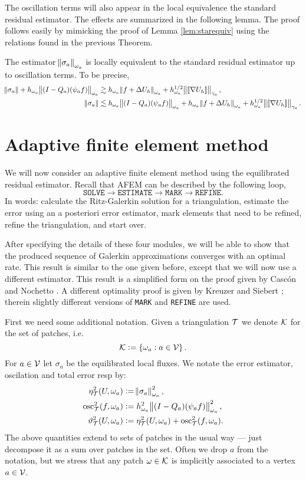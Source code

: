 \documentclass[thesis.tex]{subfiles}
\begin{document}
The oscillation terms will also appear in the local equivalence the standard residual estimator. 
The effects are summarized in the following lemma. The proof follows easily by mimicking the proof of Lemma \ref{lem:starequiv}
using the relations found in the previous Theorem.
\begin{lem}
  \label{lem:locequivosc}
  The estimator $\norm{\sigma_a}_{\omega_a}$ is locally equivalent to the standard residual estimator up to oscillation terms.
  To be precise, 
  \begin{align*}
    \norm{\sigma_a} + h_{\omega_a}\norm{(I - Q_a)(\psi_a f)}_{\omega_a} &\gtrsim h_{\omega_a} \norm{f + \Delta U_h}_{\omega_a} + h^{1/2}_{\omega_a} \norm{\llbracket \nabla U_h \rrbracket}_{\gamma_a},\\
    \norm{\sigma_a} &\lesssim h_{\omega_a}\norm{(I - Q_a)(\psi_a f)}_{\omega_a} + h_{\omega_a} \norm{f + \Delta U_h}_{\omega_a} + h^{1/2}_{\omega_a} \norm{\llbracket \nabla U_h \rrbracket}_{\gamma_a}.
  \end{align*}
\end{lem}
\section{Adaptive finite element method}
We will now consider an adaptive finite element method using the equilibrated residual estimator.
Recall that AFEM can be described by the following loop,
\[
  \texttt{SOLVE} \to \texttt{ESTIMATE} \to \texttt{MARK} \to \texttt{REFINE}.
\]
In words: calculate the Ritz-Galerkin solution for a triangulation, estimate
the error using an a posteriori error estimator, mark elements that need to be refined, refine
the triangulation, and start over. 

After specifying the details of these four modules, we will be able to show that the produced
sequence of Galerkin approximations converges with an optimal rate. This result
is similar to the one given before, except that we will now use a different estimator. This
result is a simplified form on the proof given by Casc\'on and Nochetto \cite{cascon2012}.
A different optimality proof is given by Kreuzer and Siebert \cite{ainsworthbernstein}; therein
slightly different versions of \texttt{MARK} and \texttt{REFINE} are used.

First we need some additional notation. Given a triangulation $\mathcal{T}$ we denote $\mathcal{K}$ for the set of patches, i.e.
\[
  \mathcal{K} := \set{\omega_a : a \in \mathcal{V}}.
\]
For $a \in \mathcal{V}$ let $\sigma_a$ be the equilibrated local fluxes. We notate the
  error estimator, oscilation and total error resp by:
\begin{align*}
  \eta^2_{\mathcal{T}}(U, \omega_a) &:= \norm{\sigma_a}^2_{\omega_a}, \\
  \operatorname{osc}^2_{\mathcal{T}}(f, \omega_a) &:=h^2_{\omega_a} \norm{(I - Q_a) (\psi_a f)}^2_{\omega_a}, \\
  \vartheta^2_{\mathcal{T}}(U, \omega_a) &:= \eta^2_{\mathcal{T}}(U, \omega_a) + \operatorname{osc}^2_{\mathcal{T}}(f, \omega_a).
\end{align*}
The above quantities extend to sets of patches in the usual way 
--- just decompose it as a sum over patches in the set.
Often we drop $a$ from the notation, but we stress that any patch $\omega \in \mathcal{K}$ is implicitly
associated to a vertex $a \in \mathcal{V}$.
\end{document}

